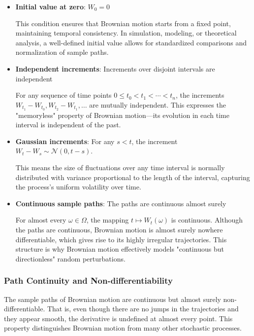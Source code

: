 \documentclass{article}
\begin{document}
\begin{itemize}

    \item \textbf{Initial value at zero}: $W_0 = 0$

    This condition ensures that Brownian motion starts from a fixed point, maintaining temporal consistency. In simulation, modeling, or theoretical analysis, a well-defined initial value allows for standardized comparisons and normalization of sample paths.

    \item \textbf{Independent increments}: Increments over disjoint intervals are independent

    For any sequence of time points $0 \leq t_0 < t_1 < \cdots < t_n$, the increments $W_{t_1} - W_{t_0}, W_{t_2} - W_{t_1}, \dots$ are mutually independent. This expresses the "memoryless" property of Brownian motion—its evolution in each time interval is independent of the past.

    \item \textbf{Gaussian increments}: For any $s < t$, the increment $W_t - W_s \sim \mathcal{N}(0, t - s)$.

    This means the size of fluctuations over any time interval is normally distributed with variance proportional to the length of the interval, capturing the process's uniform volatility over time.

    \item \textbf{Continuous sample paths}: The paths are continuous almost surely

    For almost every $\omega \in \Omega$, the mapping $t \mapsto W_t(\omega)$ is continuous. Although the paths are continuous, Brownian motion is almost surely nowhere differentiable, which gives rise to its highly irregular trajectories. This structure is why Brownian motion effectively models "continuous but directionless" random perturbations.

\end{itemize}

\subsubsection{Path Continuity and Non-differentiability}

The sample paths of Brownian motion are continuous but almost surely non-differentiable. That is, even though there are no jumps in the trajectories and they appear smooth, the derivative is undefined at almost every point. This property distinguishes Brownian motion from many other stochastic processes.
\end{document}
